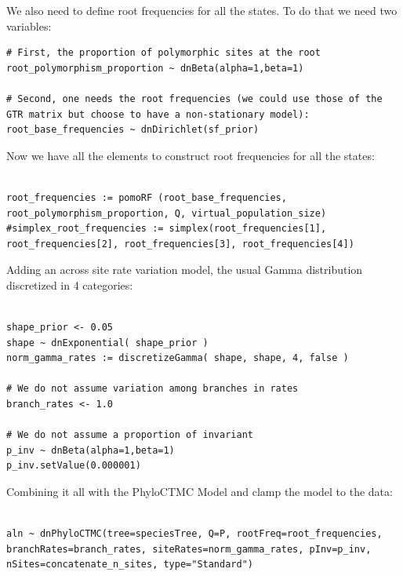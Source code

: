 \documentclass[11pt]{article}
\begin{document}
{\begin{framed}
We also need to define root frequencies for all the states.
To do that we need two variables:

 {\tt \begin{snugshade*}
\begin{lstlisting}
# First, the proportion of polymorphic sites at the root
root_polymorphism_proportion ~ dnBeta(alpha=1,beta=1)

# Second, one needs the root frequencies (we could use those of the GTR matrix but choose to have a non-stationary model):
root_base_frequencies ~ dnDirichlet(sf_prior)
\end{lstlisting}
\end{snugshade*}}

Now we have all the elements to construct root frequencies for all the states:
 {\tt \begin{snugshade*}
\begin{lstlisting}

root_frequencies := pomoRF (root_base_frequencies, root_polymorphism_proportion, Q, virtual_population_size)
#simplex_root_frequencies := simplex(root_frequencies[1], root_frequencies[2], root_frequencies[3], root_frequencies[4])

\end{lstlisting}
\end{snugshade*}}

Adding an across site rate variation model, the usual Gamma distribution discretized in 4 categories:
 {\tt \begin{snugshade*}
\begin{lstlisting}

shape_prior <- 0.05 
shape ~ dnExponential( shape_prior )
norm_gamma_rates := discretizeGamma( shape, shape, 4, false )

# We do not assume variation among branches in rates
branch_rates <- 1.0

# We do not assume a proportion of invariant
p_inv ~ dnBeta(alpha=1,beta=1)
p_inv.setValue(0.000001)
\end{lstlisting}
\end{snugshade*}}

Combining it all with the PhyloCTMC Model and clamp the model to the data:
 {\tt \begin{snugshade*}
\begin{lstlisting}

aln ~ dnPhyloCTMC(tree=speciesTree, Q=P, rootFreq=root_frequencies, branchRates=branch_rates, siteRates=norm_gamma_rates, pInv=p_inv, nSites=concatenate_n_sites, type="Standard")


\end{lstlisting}
\end{snugshade*}}
\end{framed}}
\end{document}
